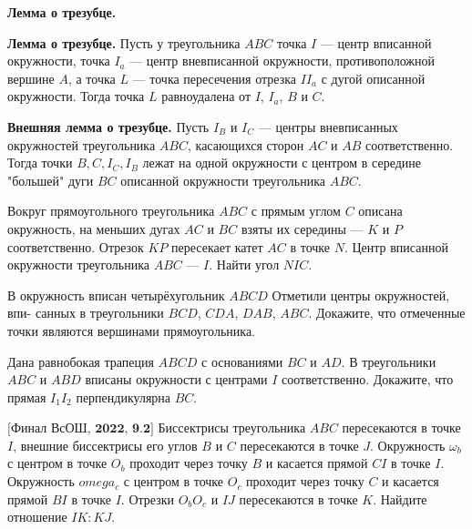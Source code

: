 \centerline{\bf \Huge Лемма о трезубце.}
\centerline{\bf \Huge }

\begin{flushright}
        \scriptsize{}
\end{flushright}


\noindent\textbf{Лемма о трезубце.}  Пусть у треугольника \( ABC \) точка \( I \) — центр вписанной окружности, точка \( I_a \) — центр вневписанной окружности, противоположной вершине \( A \), а точка \( L \) — точка пересечения отрезка \( II_a \) с дугой описанной окружности. Тогда точка \( L \) равноудалена от \( I \), \( I_a \), \( B \) и \( C \).

\noindent\textbf{Внешняя лемма о трезубце.} Пусть $I_B$ и $I_C$ --- центры вневписанных окружностей треугольника $ABC$, касающихся сторон $AC$ и $AB$ соответственно. Тогда точки $B, C, I_C, I_B$  лежат на одной окружности с центром в середине "большей" дуги $BC$ описанной окружности треугольника $ABC$.

Вокруг прямоугольного треугольника $ABC$ с прямым углом $C$ описана окружность, на меньших дугах $AC$ и $BC$   взяты их середины --- $K$ и $P$  соответственно. Отрезок $KP$ пересекает катет $AC$ в точке $N$.   Центр вписанной окружности треугольника $ABC$  ---  $I$.   Найти угол $NIC$.

В окружность вписан четырёхугольник $ABCD$ Отметили центры окружностей, впи-
санных в треугольники $BCD$, $CDA$, $DAB$, $ABC$. Докажите, что отмеченные точки являются вершинами прямоугольника.

Дана равнобокая трапеция $ABCD$ с основаниями $BC$ и $AD$. В треугольники $ABC$ и $ABD$ вписаны окружности с центрами $I$ соответственно. Докажите, что прямая $I_1I_2$   перпендикулярна $BC$.

$\bigl[\textbf{Финал ВсОШ, 2022, 9.2}\bigr]$
Биссектрисы треугольника $ABC$ пересекаются в точке $I$, внешние биссектрисы его углов $B$ и $C$ пересекаются в точке $J$. Окружность $\omega_b$ с центром в точке $O_b$ проходит через точку $B$ и касается прямой $CI$ в точке $I$. Окружность $omega_c$ с центром в точке $O_c$ проходит через точку $C$ и касается прямой $BI$ в точке $I$. Отрезки $O_bO_c$ и $IJ$ пересекаются в точке $K$. Найдите отношение $IK : KJ$.
